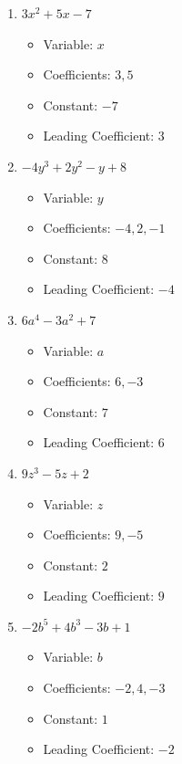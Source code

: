 \documentclass[12pt]{article}
\begin{document}
\begin{enumerate}
    \item $3x^2 + 5x - 7$
    \begin{itemize}
        \item Variable: $x$
        \item Coefficients: $3, 5$
        \item Constant: $-7$
        \item Leading Coefficient: $3$
    \end{itemize}
    
    \item $-4y^3 + 2y^2 - y + 8$
    \begin{itemize}
        \item Variable: $y$
        \item Coefficients: $-4, 2, -1$
        \item Constant: $8$
        \item Leading Coefficient: $-4$
    \end{itemize}
    
    \item $6a^4 - 3a^2 + 7$
    \begin{itemize}
        \item Variable: $a$
        \item Coefficients: $6, -3$
        \item Constant: $7$
        \item Leading Coefficient: $6$
    \end{itemize}
    
    \item $9z^3 - 5z + 2$
    \begin{itemize}
        \item Variable: $z$
        \item Coefficients: $9, -5$
        \item Constant: $2$
        \item Leading Coefficient: $9$
    \end{itemize}
    
    \item $-2b^5 + 4b^3 - 3b + 1$
    \begin{itemize}
        \item Variable: $b$
        \item Coefficients: $-2, 4, -3$
        \item Constant: $1$
        \item Leading Coefficient: $-2$
    \end{itemize}
\end{enumerate}
\end{document}
